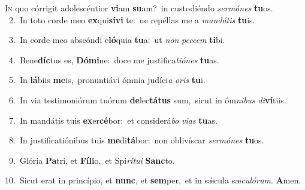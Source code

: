 \lettrine{\initial\textcolor{\initialcolor}{I}}{n} quo córrigit adolescéntior \textbf{vi}\-am \textbf{su}\-am?~\star in custodiéndo \textit{ser}\-\textit{mó}\textit{nes} \textbf{tu}\-os.\\
{\numbfont\textcolor{\numbcolor}{~2.}}~In toto corde meo \textbf{ex}\-qui\-\textbf{sí}\-\textbf{vi} te:~\star ne repéllas me a \textit{man}\-\textit{dá}\textit{tis} \textbf{tu}\-is.\par
{\numbfont\textcolor{\numbcolor}{~3.}}~In corde meo abscóndi e\-\textbf{ló}\-quia \textbf{tu}\-a:~\star ut \textit{non} \textit{pec}\-\textit{cem} \textbf{ti}\-bi.\par
{\numbfont\textcolor{\numbcolor}{~4.}}~Bene\-\textbf{díc}\-tus es, \textbf{Dó}\-\textbf{mi}ne:~\star doce me justifica\-\textit{ti}\-\textit{ó}\textit{nes} \textbf{tu}\-as.\par
{\numbfont\textcolor{\numbcolor}{~5.}}~In \textbf{lá}\-biis \textbf{me}\-is,~\star pronuntiávi ómnia judíci\textit{a} \textit{o}\-\textit{ris} \textbf{tu}\-i.\par
{\numbfont\textcolor{\numbcolor}{~6.}}~In via testimoniórum tuórum \textbf{de}\-lec\-\textbf{tá}\-\textbf{tus} sum,~\star sicut in óm\-\textit{ni}\-\textit{bus} \textit{di}\-\textbf{ví}tiis.\par
{\numbfont\textcolor{\numbcolor}{~7.}}~In mandátis tuis \textbf{ex}\-er\-\textbf{cé}\-bor:~\star et considerá\textit{bo} \textit{vi}\-\textit{as} \textbf{tu}\-as.\par
{\numbfont\textcolor{\numbcolor}{~8.}}~In justificatiónibus tuis \textbf{me}\-di\-\textbf{tá}\-bor:~\star non oblivíscar \textit{ser}\-\textit{mó}\textit{nes} \textbf{tu}\-os.\par
{\numbfont\textcolor{\numbcolor}{~9.}}~Glória \textbf{Pa}\-tri, et \textbf{Fí}\-\textbf{li}o,~\star et Spi\-\textit{rí}\-\textit{tu}\textit{i} \textbf{Sanc}\-to.\par
{\numbfont\textcolor{\numbcolor}{10.}}~Sicut erat in princípio, et \textbf{nunc}\-, et \textbf{sem}\-per,~\star et in sǽcula sæ\-\textit{cu}\-\textit{ló}\textit{rum}. \textbf{A}\-men.\par
